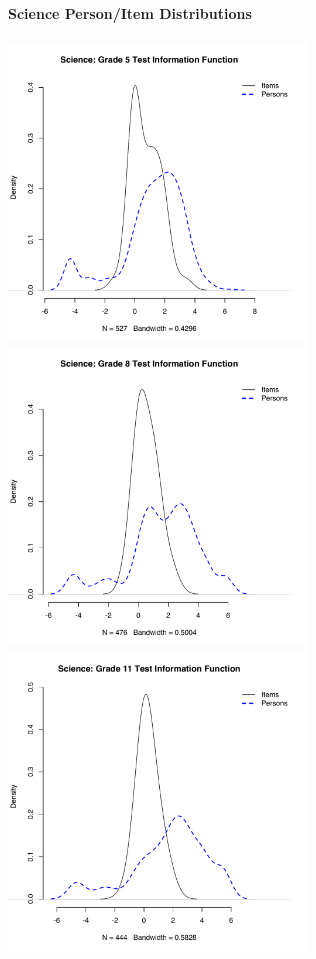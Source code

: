 \documentclass[]{article}
\let\oldparagraph\paragraph
\renewcommand{\paragraph}[1]{\oldparagraph{#1}\mbox{}}
\begin{document}
\paragraph{Science Person/Item
Distributions}\label{science-personitem-distributions}

\FloatBarrier
\includegraphics[height=3.12500in]{ipdens/science5ipdens.pdf}
\includegraphics[height=3.12500in]{ipdens/science8ipdens.pdf}
\includegraphics[height=3.12500in]{ipdens/science11ipdens.pdf}
\end{document}
